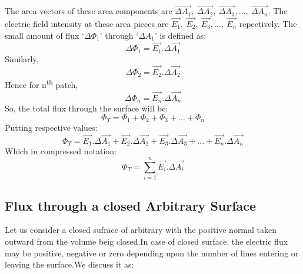 The area vectors of these area components are $\vec{\Delta A_{1}},\:\vec{\Delta A_{2}},\:\vec{\Delta A_{3}},...,\:\vec{\Delta A_{n}}$.
The electric field intensity at these area pieces are $\vec{E_{1}},\:\vec{E_{2}},\:\vec{E_{3}},...,\:\vec{E_{n}}$ repectively.
The small amount of flux `$\Delta \Phi_{1}$' through `$\Delta A_{1}$' is defined as:
\begin{equation}
  \Delta \Phi_{1} = \vec{E_{1}}.\Delta \vec{A_{1}} \nonumber
\end{equation}
Similarly,
\begin{equation}
  \Delta \Phi_{2} = \vec{E_{2}}.\Delta \vec{A_{2}} \nonumber
\end{equation}
Hence for n\textsuperscript{th} patch, 
\begin{equation}
  \Delta \Phi_{n} = \vec{E_{n}}.\Delta \vec{A_{n}} \nonumber
\end{equation}
So, the total flux through the surface will be:
\begin{equation}
  \Phi_{T} =  \Phi_{1}+ \Phi_{2}+ \Phi_{3}+...+ \Phi_{n} \nonumber
\end{equation}
Putting respective values:
\begin{equation}
  \Phi_{T} = \vec{E_{1}}.\Delta \vec{A_{1}}+\vec{E_{2}}.\Delta \vec{A_{2}} +\vec{E_{3}}.\Delta \vec{A_{3}}+...+\vec{E_{n}}.\Delta \vec{A_{n}} \nonumber
\end{equation}
Which in compressed notation:
\begin{equation} \label{eq:11.19}
  \Phi_{T} = \sum_{i=1}^{n} \vec{E_{i}}.\Delta \vec{A_{i}} 
\end{equation}
\subsection{Flux through a closed Arbitrary Surface}
Let us consider a closed sufrace of arbitrary with the positive normal
taken outward from the volume beig closed.In case of closed surface,
the electric flux may be positive, negative or zero depending upon
the number of lines entering or leaving the surface.We discuss it as:

